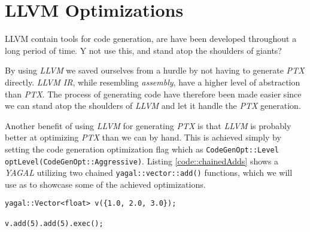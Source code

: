 \section{LLVM Optimizations}

LLVM contain tools for code generation, are have been developed throughout a long period of time. Y not use this, and stand atop the shoulders of giants?

By using \textit{LLVM} we saved ourselves from a hurdle by not having to generate \textit{PTX} directly. \textit{LLVM IR}, while resembling \textit{assembly}, have a higher level of abstraction than \textit{PTX}. The process of generating code have therefore been made easier since we can stand atop the shoulders of \textit{LLVM} and let it handle the \textit{PTX} generation.

Another benefit of using \textit{LLVM} for generating \textit{PTX} is that \textit{LLVM} is probably better at optimizing \textit{PTX} than we can by hand. This is achieved simply by setting the code generation optimization flag which as \texttt{CodeGenOpt::Level optLevel(CodeGenOpt::Aggressive)}. Listing \ref{code::chainedAdds} shows a \textit{YAGAL} utilizing two chained \texttt{yagal::vector::add()} functions, which we will use as to showcase some of the achieved optimizations.

\begin{lstlisting}[caption={Chained \texttt{yagal::vector::add}}, label={code::chainedAdds}]
yagal::Vector<float> v({1.0, 2.0, 3.0});

v.add(5).add(5).exec();
\end{lstlisting}

